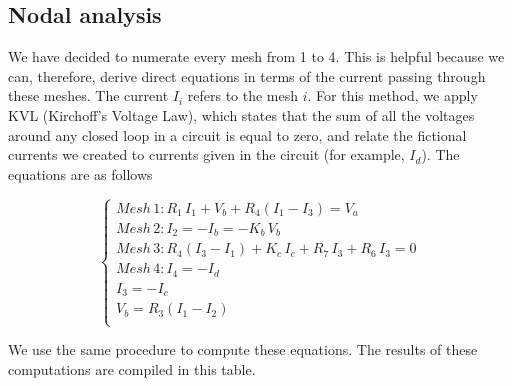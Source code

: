 
\subsection{Nodal analysis}

We have decided to numerate every mesh from 1 to 4. This is helpful because we can, therefore, derive direct equations in terms of the current passing through these meshes. The current $I_i$ refers to the mesh $i$. For this method, we apply KVL (Kirchoff's Voltage Law), which states that the sum of all the voltages around any closed loop in a circuit is equal to zero, and relate the fictional currents we created to currents given in the circuit (for example, $I_d$). The equations are as follows

\begin{equation} 
\begin{cases}  
    Mesh\, 1: R_1\,I_1 + V_b + R_4(I_1 - I_3) = V_a \\
    Mesh\, 2: I_2 = -I_b = -K_b\, V_b\\
    Mesh\, 3: R_4(I_3 - I_1) + K_c\,I_c + R_7\,I_3 + R_6\,I_3 = 0 \\
    Mesh\, 4: I_4 = -I_d \\
    I_3 = -I_c \\
    V_b = R_3(I_1 - I_2) \\
    
    
\end{cases}
\label{eq:2}
\end{equation}

We use the same procedure to compute these equations. The results of these computations are compiled in this table.

